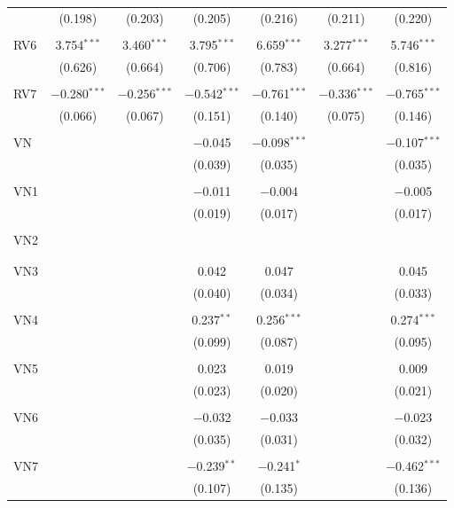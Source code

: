 \begin{table}[!htbp]
\begin{tabular}{@{\extracolsep{5pt}}lcccccc}
  & (0.198) & (0.203) & (0.205) & (0.216) & (0.211) & (0.220) \\ 
  & & & & & & \\ 
 RV6 & 3.754$^{***}$ & 3.460$^{***}$ & 3.795$^{***}$ & 6.659$^{***}$ & 3.277$^{***}$ & 5.746$^{***}$ \\ 
  & (0.626) & (0.664) & (0.706) & (0.783) & (0.664) & (0.816) \\ 
  & & & & & & \\ 
 RV7 & $-$0.280$^{***}$ & $-$0.256$^{***}$ & $-$0.542$^{***}$ & $-$0.761$^{***}$ & $-$0.336$^{***}$ & $-$0.765$^{***}$ \\ 
  & (0.066) & (0.067) & (0.151) & (0.140) & (0.075) & (0.146) \\ 
  & & & & & & \\ 
 VN &  &  & $-$0.045 & $-$0.098$^{***}$ &  & $-$0.107$^{***}$ \\ 
  &  &  & (0.039) & (0.035) &  & (0.035) \\ 
  & & & & & & \\ 
 VN1 &  &  & $-$0.011 & $-$0.004 &  & $-$0.005 \\ 
  &  &  & (0.019) & (0.017) &  & (0.017) \\ 
  & & & & & & \\ 
 VN2 &  &  &  &  &  &  \\ 
  &  &  &  &  &  &  \\ 
  & & & & & & \\ 
 VN3 &  &  & 0.042 & 0.047 &  & 0.045 \\ 
  &  &  & (0.040) & (0.034) &  & (0.033) \\ 
  & & & & & & \\ 
 VN4 &  &  & 0.237$^{**}$ & 0.256$^{***}$ &  & 0.274$^{***}$ \\ 
  &  &  & (0.099) & (0.087) &  & (0.095) \\ 
  & & & & & & \\ 
 VN5 &  &  & 0.023 & 0.019 &  & 0.009 \\ 
  &  &  & (0.023) & (0.020) &  & (0.021) \\ 
  & & & & & & \\ 
 VN6 &  &  & $-$0.032 & $-$0.033 &  & $-$0.023 \\ 
  &  &  & (0.035) & (0.031) &  & (0.032) \\ 
  & & & & & & \\ 
 VN7 &  &  & $-$0.239$^{**}$ & $-$0.241$^{*}$ &  & $-$0.462$^{***}$ \\ 
  &  &  & (0.107) & (0.135) &  & (0.136) \\ 

\end{tabular}
\end{table}
